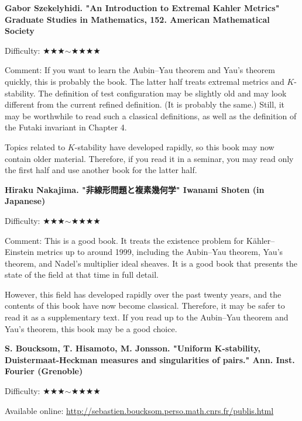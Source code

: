 \textbf{Gabor Szekelyhidi. "An Introduction to Extremal Kahler Metrics" Graduate Studies in Mathematics, 152. American Mathematical Society}  \vspace{-6pt} 

Difficulty: ★★★$\sim$★★★★ \vspace{-6pt} 

Comment: If you want to learn the Aubin--Yau theorem and Yau's theorem quickly, this is probably the book. The latter half treats extremal metrics and $K$-stability. The definition of test configuration may be slightly old and may look different from the current refined definition. (It is probably the same.) Still, it may be worthwhile to read such a classical definitions, as well as the definition of the Futaki invariant in Chapter 4.

Topics related to $K$-stability have developed rapidly, so this book may now contain older material. Therefore, if you read it in a seminar, you may read only the first half and use another book for the latter half.
\vspace{8pt}

\textbf{Hiraku Nakajima. "非線形問題と複素幾何学" Iwanami Shoten  (in Japanese)}  \vspace{-6pt} 

Difficulty: ★★★$\sim$★★★★ \vspace{-6pt} 

Comment: This is a good book. It treats the existence problem for K\"ahler--Einstein metrics up to around 1999, including the Aubin--Yau theorem, Yau's theorem, and Nadel's multiplier ideal sheaves. It is a good book that presents the state of the field at that time in full detail.

However, this field has developed rapidly over the past twenty years, and the contents of this book have now become classical. Therefore, it may be safer to read it as a supplementary text. If you read up to the Aubin--Yau theorem and Yau's theorem, this book may be a good choice.
\vspace{8pt}

\textbf{S. Boucksom, T. Hisamoto, M. Jonsson. "Uniform K-stability, Duistermaat-Heckman measures and singularities of pairs." Ann. Inst. Fourier (Grenoble)}  \vspace{-6pt} 

Difficulty: ★★★$\sim$★★★★ \vspace{-6pt} 

Available online: \url{http://sebastien.boucksom.perso.math.cnrs.fr/publis.html}

